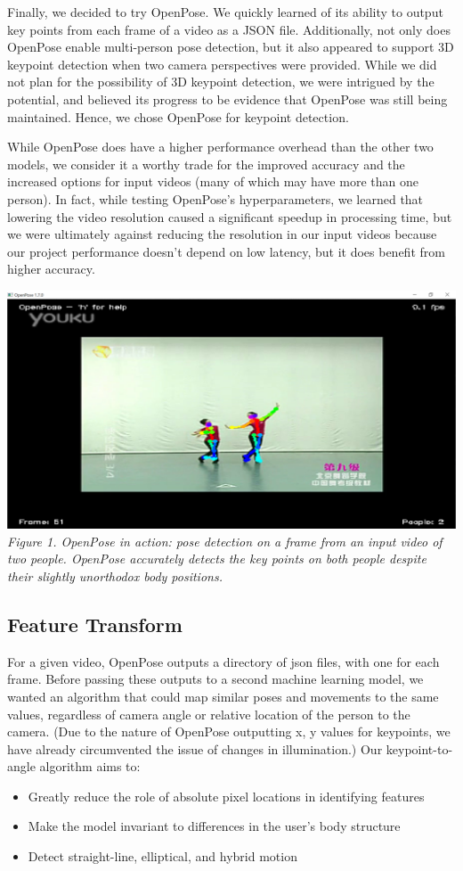 \indent Finally, we decided to try OpenPose. We quickly learned of its ability to output key points from each frame of a 
video as a JSON file. Additionally, not only does OpenPose enable multi-person pose detection, but it also appeared 
to support 3D keypoint detection when two camera perspectives were provided. While we did not plan for the possibility 
of 3D keypoint detection, we were intrigued by the potential, and believed its progress to be evidence that OpenPose 
was still being maintained. Hence, we chose OpenPose for keypoint detection.
	
\indent While OpenPose does have a higher performance overhead than the other two models, we consider it a worthy trade for the 
improved accuracy and the increased options for input videos (many of which may have more than one person). In fact, while 
testing OpenPose’s hyperparameters, we learned that lowering the video resolution caused a significant speedup in 
processing time, but we were ultimately against reducing the resolution in our input videos because our project 
performance doesn’t depend on low latency, but it does benefit from higher accuracy.

\includegraphics[width=\columnwidth]{sec/openpose_demo}
\textit{Figure 1. OpenPose in action: pose detection on a frame from an input video of two people. 
OpenPose accurately detects the key points on both people despite their slightly unorthodox body positions.}

\subsection{Feature Transform}
\indent For a given video, OpenPose outputs a directory of json files, with one for each frame. Before passing these outputs to a 
second machine learning model, we wanted an algorithm that could map similar poses and movements to the same values, 
regardless of camera angle or relative location of the person to the camera. (Due to the nature of OpenPose outputting x, 
y values for keypoints, we have already circumvented the issue of changes in illumination.)  Our keypoint-to-angle algorithm 
aims to:
\begin{itemize}
    \item Greatly reduce the role of absolute pixel locations in identifying features
    \item Make the model invariant to differences in the user’s body structure
    \item Detect straight-line, elliptical, and hybrid motion
\end{itemize}

